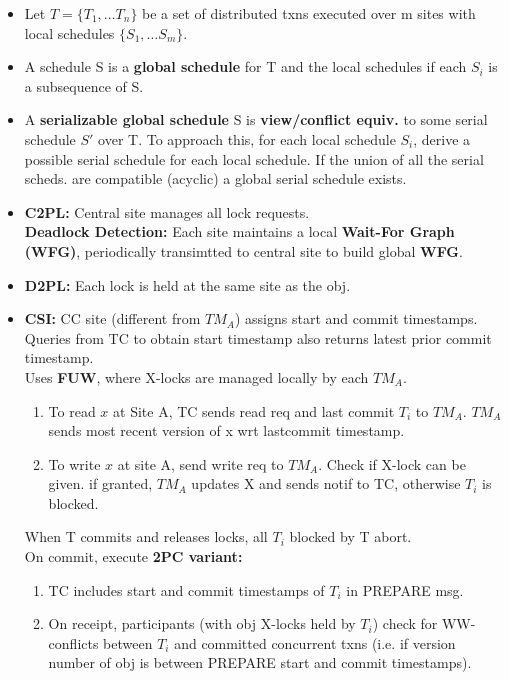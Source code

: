 \documentclass[8pt, landscape]{extarticle}
\begin{document}
\begin{multicols*}{4}
\begin{itemize}
    \item Let $T=\{ T_1, \dots T_n\}$ be a set of distributed txns executed over m sites with local schedules $\{ S_1, \dots S_m \}$.
    \item A schedule S is a \textbf{global schedule} for T and the local schedules if each $S_i$ is a subsequence of S.
    \item A \textbf{serializable global schedule} S is \textbf{view/conflict equiv.} to some serial schedule $S'$ over T. To approach this, for each local schedule $S_i$, derive a possible serial schedule for each local schedule. If the union of all the serial scheds. are compatible (acyclic) a global serial schedule exists.
    \item \textbf{C2PL:} Central site manages all lock requests. \\
    \textbf{Deadlock Detection:} Each site maintains a local \textbf{Wait-For Graph (WFG)}, periodically transimtted to central site to build global \textbf{WFG}.
    \item \textbf{D2PL:} Each lock is held at the same site as the obj.
    \item \textbf{CSI:} CC site (different from $TM_A$) assigns start and commit timestamps. Queries from TC to obtain start timestamp also returns latest prior commit timestamp. \\
    Uses \textbf{FUW}, where X-locks are managed locally by each $TM_A$.
    \begin{enumerate}
        \item To read $x$ at Site A, TC sends read req and last commit $T_i$ to $TM_A$. $TM_A$ sends most recent version of x wrt lastcommit timestamp.
        \item To write $x$ at site A, send write req to $TM_A$. Check if X-lock can be given. if granted, $TM_A$ updates X and sends notif to TC, otherwise $T_i$ is blocked.
    \end{enumerate}
    When T commits and releases locks, all $T_i$ blocked by T abort.\\
    On commit, execute \textbf{2PC variant:}
    \begin{enumerate}
        \item TC includes start and commit timestamps of $T_i$ in PREPARE msg.
        \item On receipt, participants (with obj X-locks held by $T_i$) check for WW-conflicts between $T_i$ and committed concurrent txns (i.e. if version number of obj is between PREPARE start and commit timestamps).
    \end{enumerate}
\end{itemize}


\end{multicols*}
\end{document}
